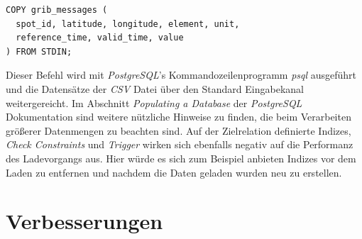 \begin{lstlisting}[captionpos=b, caption=Befehl zum Import von Datensätzen in \textit{PostgreSQL}, label=lst:copy]
COPY grib_messages (
  spot_id, latitude, longitude, element, unit, 
  reference_time, valid_time, value
) FROM STDIN;
\end{lstlisting}

Dieser Befehl wird mit \textit{PostgreSQL}'s Kommandozeilenprogramm
\textit{psql} ausgeführt und die Datensätze der \textit{CSV} Datei
über den Standard Eingabekanal weitergereicht. Im Abschnitt
\textit{Populating a Database} \cite{postgresql:populate} der
\textit{PostgreSQL} Dokumentation sind weitere nützliche Hinweise zu
finden, die beim Verarbeiten größerer Datenmengen zu beachten
sind. Auf der Zielrelation definierte Indizes, \textit{Check
  Constraints} und \textit{Trigger} wirken sich ebenfalls negativ auf
die Performanz des Ladevorgangs aus. Hier würde es sich zum Beispiel
anbieten Indizes vor dem Laden zu entfernen und nachdem die Daten
geladen wurden neu zu erstellen.








\section{Verbesserungen}

